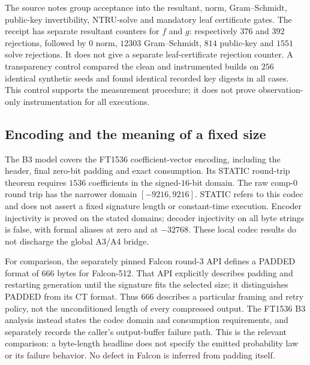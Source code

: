 The source notes group acceptance into the resultant, norm,
Gram--Schmidt, public-key invertibility, NTRU-solve and mandatory leaf
certificate gates. The receipt has separate resultant counters for
$f$ and $g$: respectively $376$ and $392$ rejections, followed by
$0$ norm, $12303$ Gram--Schmidt, $814$ public-key and $1551$ solve
rejections. It does not give a separate leaf-certificate rejection
counter. A transparency control compared the clean and instrumented
builds on $256$ identical synthetic seeds and found identical recorded
key digests in all cases. This control supports the measurement procedure;
it does not prove observation-only instrumentation for all executions.

\subsection{Encoding and the meaning of a fixed size}
The B3 model covers the FT1536 coefficient-vector encoding, including
the header, final zero-bit padding and exact consumption. Its STATIC
round-trip theorem requires $1536$ coefficients in the signed-$16$-bit
domain. The raw comp-0 round trip has the narrower domain
$[-9216,9216]$. STATIC refers to this codec and does not assert a fixed
signature length or constant-time execution. Encoder injectivity is
proved on the stated domains; decoder injectivity on all byte strings
is false, with formal aliases at zero and at $-32768$. These local
codec results do not discharge the global A3/A4 bridge.

For comparison, the separately pinned Falcon round-3 API defines a
PADDED format of $666$ bytes for Falcon-512. That API explicitly describes
padding and restarting generation until the signature fits the selected
size; it distinguishes PADDED from its CT format. Thus $666$ describes a
particular framing and retry policy, not the unconditioned length of
every compressed output. The FT1536 B3 analysis instead states the
codec domain and consumption requirements, and separately records the
caller's output-buffer failure path. This is the relevant comparison:
a byte-length headline does not specify the emitted probability law or
its failure behavior. No defect in Falcon is inferred from padding
itself.
